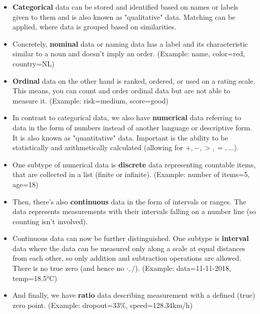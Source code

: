 \begin{itemize}
  \item {}\textbf{Categorical} data can be stored and identified based on names or labels given to them and is also known as "qualitative" data. Matching can be applied, where data is grouped based on similarities.
  
  \item Concretely, \textbf{nominal} data or naming data has a label and its characteristic similar to a noun and doesn't imply an order. {\footnotesize\color{ForestGreen}(Example: name, color=red, country=NL)}
  
  \item {}\textbf{Ordinal} data on the other hand is ranked, ordered, or used on a rating scale. This means, you can count and order ordinal data but are not able to measure it. {\footnotesize\color{ForestGreen}(Example: risk=medium, score=good)}
  
  \item In contrast to categorical data, we also have \textbf{numerical} data referring to data in the form of numbers instead of another language or descriptive form. It is also known as "quantitative" data. Important is the ability to be statistically and arithmetically calculated (allowing for $+, -, >, =, \dots$).
  
  \item One subtype of numerical data is \textbf{discrete} data representing countable items, that are collected in a list (finite or infinite). {\footnotesize\color{ForestGreen}(Example: number of items=5, age=18)}
  
  \item Then, there's also \textbf{continuous} data in the form of intervals or ranges. The data represents measurements with their intervals falling on a number line (so counting isn't involved).
  
  \item Continuous data can now be further distinguished. One subtype is \textbf{interval} data where the data can be measured only along a scale at equal distances from each other, so only addition and subtraction operations are allowed. There is no true zero (and hence no $\cdot, /$). {\footnotesize\color{ForestGreen}(Example: data=11-11-2018, temp=18.5°C)}
  
  \item And finally, we have \textbf{ratio} data describing measurement with a defined (true) zero point. {\footnotesize\color{ForestGreen}(Example: dropout=33\%, speed=128.34km/h)}
\end{itemize}

